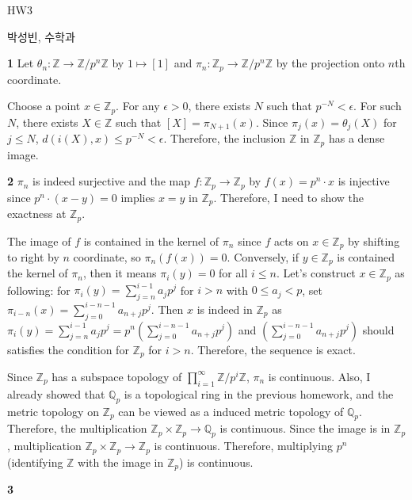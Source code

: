 \documentclass[a4paper, 12pt]{article}
\theoremstyle{Mydefinition}
\theoremstyle{Mytheorem}
\begin{document}
\thispagestyle{myfirstpage}
\begin{center}
	\Large{HW3}
\end{center}
박성빈, 수학과

\noindent \textbf{1}
Let $\theta_n:\mathbb{Z}\rightarrow \mathbb{Z}/p^n\mathbb{Z}$ by $1\mapsto [1]$ and $\pi_n:\mathbb{Z}_p\rightarrow \mathbb{Z}/p^n\mathbb{Z}$ by the projection onto $n$th coordinate.

Choose a point $x\in \mathbb{Z}_p$. For any $\epsilon>0$, there exists $N$ such that $p^{-N}<\epsilon$. For such $N$, there exists $X\in\mathbb{Z}$ such that $[X] = \pi_{N+1}(x)$. Since $\pi_j(x) = \theta_j(X)$ for $j\leq N$, $d(i(X), x)\leq p^{-N}<\epsilon$. Therefore, the inclusion $\mathbb{Z}$ in $\mathbb{Z}_p$ has a dense image.

\noindent \textbf{2}
$\pi_n$ is indeed surjective and the map $f:\mathbb{Z}_p\rightarrow\mathbb{Z}_p$ by $f(x) = p^n\cdot x$ is injective since $p^n\cdot(x-y) = 0$ implies $x=y$ in $\mathbb{Z}_p$. Therefore, I need to show the exactness at $\mathbb{Z}_p$.

The image of $f$ is contained in the kernel of $\pi_n$ since $f$ acts on $x\in\mathbb{Z}_p$ by shifting to right by $n$ coordinate, so $\pi_n(f(x)) = 0$. Conversely, if $y\in\mathbb{Z}_p$ is contained the kernel of $\pi_n$, then it means $\pi_i(y) = 0$ for all $i\leq n$. Let's construct $x\in \mathbb{Z}_p$ as following: for $\pi_i(y) = \sum_{j=n}^{i-1} a_j p^j$ for $i> n$ with $0\leq a_j<p$, set $\pi_{i-n}(x) = \sum_{j=0}^{i-n-1} a_{n+j} p^j$. Then $x$ is indeed in $\mathbb{Z}_p$ as $\pi_i(y) = \sum_{j=n}^{i-1} a_j p^j = p^n\left(\sum_{j=0}^{i-n-1} a_{n+j} p^j\right)$ and $\left(\sum_{j=0}^{i-n-1} a_{n+j} p^j\right)$ should satisfies the condition for $\mathbb{Z}_p$ for $i>n$. Therefore, the sequence is exact.

Since $\mathbb{Z}_p$ has a subspace topology of $\prod_{i=1}^\infty \mathbb{Z}/p^i\mathbb{Z}$, $\pi_n$ is continuous. Also, I already showed that $\mathbb{Q}_p$ is a topological ring in the previous homework, and the metric topology on $\mathbb{Z}_p$ can be viewed as a induced metric topology of $\mathbb{Q}_p$. Therefore, the multiplication $\mathbb{Z}_p\times\mathbb{Z}_p\rightarrow\mathbb{Q}_p$ is continuous. Since the image is in $\mathbb{Z}_p$, multiplication $\mathbb{Z}_p\times\mathbb{Z}_p\rightarrow\mathbb{Z}_p$ is continuous. Therefore, multiplying $p^n$ (identifying $\mathbb{Z}$ with the image in $\mathbb{Z}_p$) is continuous.

\noindent \textbf{3}
\end{document}
